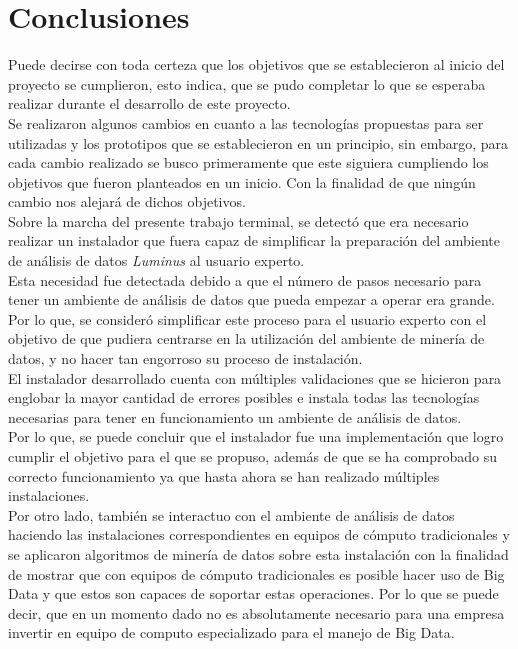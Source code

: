 \section{Conclusiones}
Puede decirse con toda certeza que los objetivos que se establecieron al inicio del proyecto se cumplieron, esto indica, que se pudo completar lo que se esperaba realizar durante el desarrollo de este proyecto. 
\\
Se realizaron algunos cambios en cuanto a las tecnologías propuestas para ser utilizadas y los prototipos que se establecieron en un principio, sin embargo, para cada cambio realizado se busco primeramente que este siguiera cumpliendo los objetivos que fueron planteados en un inicio. Con la finalidad de que ningún cambio nos alejará de dichos objetivos.
\\
Sobre la marcha del presente trabajo terminal, se detectó que era necesario realizar un instalador que fuera capaz de simplificar la preparación del ambiente de análisis de datos \emph{Luminus} al usuario experto.  
\\
Esta necesidad fue detectada debido a que el número de pasos necesario para tener un ambiente de análisis de datos que pueda empezar a operar era grande. Por lo que, se consideró simplificar este proceso para el usuario experto con el objetivo de que pudiera centrarse en la utilización del ambiente de minería de datos, y no hacer tan engorroso su proceso de instalación.
\\
El instalador desarrollado cuenta con múltiples validaciones que se hicieron para englobar la mayor cantidad de errores posibles e instala todas las tecnologías necesarias para tener en funcionamiento un ambiente de análisis de datos. 
\\
Por lo que, se puede concluir que el instalador fue una implementación que logro cumplir el objetivo para el que se propuso, además de que se ha comprobado su correcto funcionamiento ya que hasta ahora se han realizado múltiples instalaciones.
\\
Por otro lado, también se interactuo con el ambiente de análisis de datos haciendo las instalaciones correspondientes en equipos de cómputo tradicionales y se aplicaron algoritmos de minería de datos sobre esta instalación con la finalidad de mostrar que con equipos de cómputo tradicionales es posible hacer uso de Big Data y que estos son capaces de soportar estas operaciones. Por lo que se puede decir, que en un momento dado no es absolutamente necesario para una empresa invertir en equipo de computo especializado para el manejo de Big Data.
